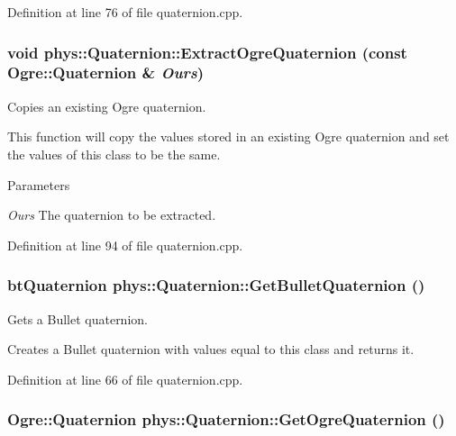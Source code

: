 Definition at line 76 of file quaternion.cpp.

\hypertarget{classphys_1_1Quaternion_a942fab675a0b124e1dc5e2febab113e6}{
\subsubsection[{ExtractOgreQuaternion}]{\setlength{\rightskip}{0pt plus 5cm}void phys::Quaternion::ExtractOgreQuaternion (const Ogre::Quaternion \& {\em Ours})}}
\label{df/d8c/classphys_1_1Quaternion_a942fab675a0b124e1dc5e2febab113e6}


Copies an existing Ogre quaternion. 

This function will copy the values stored in an existing Ogre quaternion and set the values of this class to be the same. 
\begin{DoxyParams}{Parameters}
\item[{\em Ours}]The quaternion to be extracted. \end{DoxyParams}


Definition at line 94 of file quaternion.cpp.

\hypertarget{classphys_1_1Quaternion_afcda116299201599a803e48719f6d50e}{
\subsubsection[{GetBulletQuaternion}]{\setlength{\rightskip}{0pt plus 5cm}btQuaternion phys::Quaternion::GetBulletQuaternion ()}}
\label{df/d8c/classphys_1_1Quaternion_afcda116299201599a803e48719f6d50e}


Gets a Bullet quaternion. 

Creates a Bullet quaternion with values equal to this class and returns it. 

Definition at line 66 of file quaternion.cpp.

\hypertarget{classphys_1_1Quaternion_a022ed1ed25a8324b8fc0c4d8b0e7a675}{
\subsubsection[{GetOgreQuaternion}]{\setlength{\rightskip}{0pt plus 5cm}Ogre::Quaternion phys::Quaternion::GetOgreQuaternion ()}}
\label{df/d8c/classphys_1_1Quaternion_a022ed1ed25a8324b8fc0c4d8b0e7a675}


